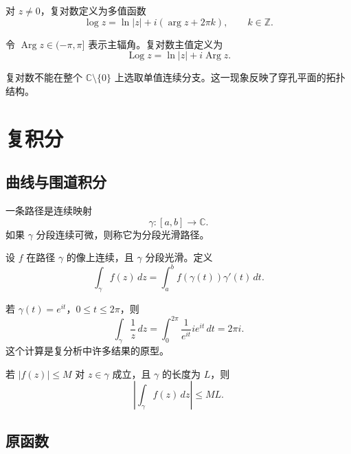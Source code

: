 \begin{definition}[多值对数]
对 $z\ne0$，复对数定义为多值函数
\[
    \log z=\ln|z|+i(\arg z+2\pi k),
    \qquad k\in\mathbb{Z}.
\]
\end{definition}

\begin{definition}[主值分支]
令 $\operatorname{Arg}z\in(-\pi,\pi]$ 表示主辐角。复对数主值定义为
\[
    \operatorname{Log}z=\ln|z|+i\operatorname{Arg}z.
\]
\end{definition}

\begin{remark}
复对数不能在整个 $\mathbb{C}\setminus\{0\}$ 上选取单值连续分支。这一现象反映了穿孔平面的拓扑结构。
\end{remark}

\section{复积分}

\subsection{曲线与围道积分}

\begin{definition}[路径]
一条路径是连续映射
\[
    \gamma:[a,b]\to\mathbb{C}.
\]
如果 $\gamma$ 分段连续可微，则称它为分段光滑路径。
\end{definition}

\begin{definition}[围道积分]
设 $f$ 在路径 $\gamma$ 的像上连续，且 $\gamma$ 分段光滑。定义
\[
    \int_\gamma f(z)\,dz
    =\int_a^b f(\gamma(t))\gamma'(t)\,dt.
\]
\end{definition}

\begin{example}
若 $\gamma(t)=e^{it}$，$0\le t\le2\pi$，则
\[
    \int_\gamma \frac1z\,dz
    =\int_0^{2\pi}\frac1{e^{it}}ie^{it}\,dt
    =2\pi i.
\]
这个计算是复分析中许多结果的原型。
\end{example}

\begin{proposition}[估计引理]
若 $|f(z)|\le M$ 对 $z\in\gamma$ 成立，且 $\gamma$ 的长度为 $L$，则
\[
    \left|\int_\gamma f(z)\,dz\right|\le ML.
\]
\end{proposition}

\subsection{原函数}

